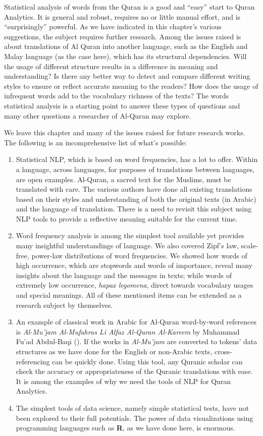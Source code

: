 \documentclass[
]{article}
\begin{document}
Statistical analysis of words from the Quran is a good and ``easy'' start to Quran Analytics. It is general and robust, requires no or little manual effort, and is ``surprisingly'' powerful. As we have indicated in this chapter's various suggestions, the subject requires further research. Among the issues raised is about translations of Al Quran into another language, such as the English and Malay language (as the case here), which has its structural dependencies. Will the usage of different structure results in a difference in meaning and understanding? Is there any better way to detect and compare different writing styles to ensure or reflect accurate meaning to the readers? How does the usage of infrequent words add to the vocabulary richness of the texts? The words statistical analysis is a starting point to answer these types of questions and many other questions a researcher of Al-Quran may explore.

We leave this chapter and many of the issues raised for future research works. The following is an incomprehensive list of what's possible:

\begin{enumerate}
\def\labelenumi{\arabic{enumi}.}
\item
  Statistical NLP, which is based on word frequencies, has a lot to offer. Within a language, across languages, for purposes of translations between languages, are open examples. Al-Quran, a sacred text for the Muslims, must be translated with care. The various authors have done all existing translations based on their styles and understanding of both the original texts (in Arabic) and the language of translation. There is a need to revisit this subject using NLP tools to provide a reflective meaning suitable for the current time.
\item
  Word frequency analysis is among the simplest tool available yet provides many insightful understandings of language. We also covered Zipf's law, scale-free, power-law distributions of word frequencies. We showed how words of high occurrence, which are stopwords and words of importance, reveal many insights about the language and the messages in texts; while words of extremely low occurrence, \emph{hapax legomena}, direct towards vocabulary usages and special meanings. All of these mentioned items can be extended as a research subject by themselves.
\item
  An example of classical work in Arabic for Al-Quran word-by-word references is \emph{Al-Mu'jam Al-Mufahras Li Alfaz Al-Quran Al-Kareem} by Muhammad Fu'ad Abdul-Baqi (\citet{mujam1945}). If the works in \emph{Al-Mu'jam} are converted to tokens' data structures as we have done for the English or non-Arabic texts, cross-referencing can be quickly done. Using this tool, any Quranic scholar can check the accuracy or appropriateness of the Quranic translations with ease. It is among the examples of why we need the tools of NLP for Quran Analytics.
\item
  The simplest tools of data science, namely simple statistical tests, have not been explored to their full potentials. The power of data visualizations using programming languages such as \textbf{R}, as we have done here, is enormous.
\end{enumerate}
\end{document}
